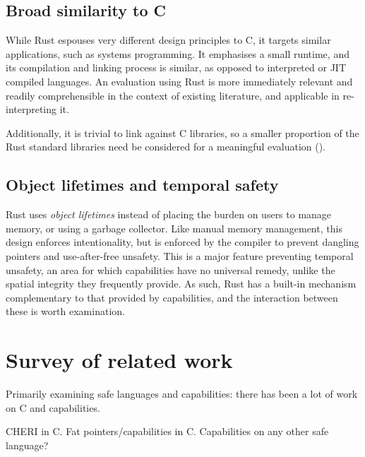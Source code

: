 \documentclass[dissertation.tex]{subfiles}
\begin{document}
\subsection{Broad similarity to C}
While Rust espouses very different design principles to C, it targets
similar applications, such as systems programming.
It emphasises a small runtime, and its compilation and linking process
is similar, as opposed to interpreted or JIT compiled languages.
An evaluation using Rust is more immediately relevant and readily
comprehensible in the context of existing literature, and applicable in
re-interpreting it.

Additionally, it is trivial to link against C libraries, so a smaller
proportion of the Rust standard libraries need be considered for a
meaningful evaluation ().


\subsection{Object lifetimes and temporal safety}
Rust uses \emph{object lifetimes} instead of placing the burden on users
to manage memory, or using a garbage collector.
Like manual memory management, this design enforces intentionality, but
is enforced by the compiler to prevent dangling pointers and
use-after-free unsafety.
This is a major feature preventing temporal unsafety, an area for which
capabilities have no universal remedy, unlike the spatial integrity they
frequently provide.
As such, Rust has a built-in mechanism complementary to that provided by
capabilities, and the interaction between these is worth examination.


\section{Survey of related work}
\label{sec:bg-related}

Primarily examining safe languages and capabilities: there has been a
lot of work on C and capabilities.


CHERI in C.
Fat pointers/capabilities in C.
Capabilities on any other safe language?


\end{document}
